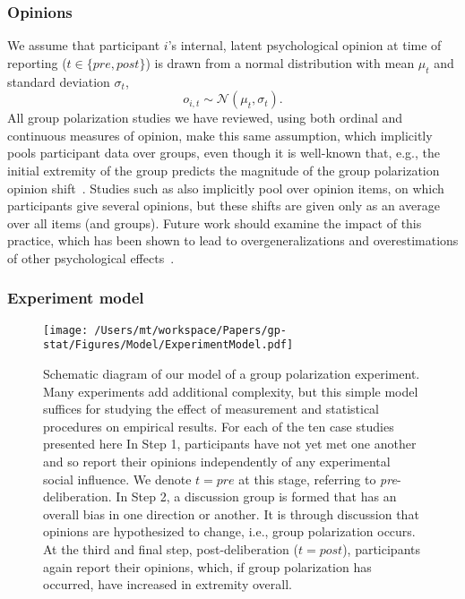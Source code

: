 \subsubsection{Opinions}

We assume that participant $i$'s internal, latent psychological opinion at 
time of reporting ($t \in \{pre, post\}$) is drawn from a normal distribution
with mean $\mu_t$ and standard deviation $\sigma_t$,
\begin{equation}
  o_{i,t} \sim \mathcal{N}(\mu_t, \sigma_t).
  \label{eq:opinionDistribution}
\end{equation}
\noindent
All group polarization studies we have reviewed, using both ordinal and
continuous measures of opinion, make this same assumption, which implicitly
pools participant data over groups, even though it is well-known that, e.g.,
the initial extremity of the group predicts the magnitude of the group
polarization opinion shift~\cite{Myers1982}. Studies such as
 also implicitly pool over opinion items, on which
participants give several opinions, but these shifts are given only as an
average over all items (and groups). Future work should examine the impact of
this practice, which has been shown to lead to overgeneralizations and
overestimations of other psychological effects~\cite{Clark1973,Yarkoni2021}.


\subsubsection{Experiment model}

\begin{figure}
  \centering

    \texttt{[image: /Users/mt/workspace/Papers/gp-stat/Figures/Model/ExperimentModel.pdf]}

  \caption{
    Schematic diagram of our model of a group polarization experiment.
    Many experiments add additional complexity, but this simple model suffices
    for studying the effect of measurement and statistical procedures on 
    empirical results. For each of the ten case studies presented here 
    In Step 1, participants have not yet met one another and
    so report their opinions independently of any experimental social influence.
    We denote $t=pre$ at this stage, referring to \emph{pre}-deliberation. 
    In Step 2, a discussion
    group is formed that has an overall bias in one direction or another.
    It is through discussion that opinions are hypothesized to change, i.e.,
    group polarization occurs. At the third and final step, post-deliberation
    ($t=post$), participants again report their opinions, which, if group 
    polarization has occurred, have increased in extremity overall. 
  }
  \label{fig:modelSchematic}
\end{figure}

